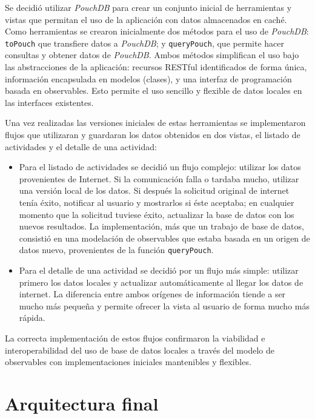Se decidió utilizar \textit{PouchDB} para crear un conjunto inicial de herramientas y vistas que permitan el uso de la aplicación con datos almacenados en caché. Como herramientas se crearon inicialmente dos métodos para el uso de \textit{PouchDB}: \texttt{toPouch} que transfiere datos a \textit{PouchDB}; y \texttt{queryPouch}, que permite hacer consultas y obtener datos de \textit{PouchDB}. Ambos métodos simplifican el uso bajo las abstracciones de la aplicación: recursos RESTful identificados de forma única, información encapsulada en modelos (clases), y una interfaz de programación basada en observables. Esto permite el uso sencillo y flexible de datos locales en las interfaces existentes.

Una vez realizadas las versiones iniciales de estas herramientas se implementaron flujos que utilizaran y guardaran los datos obtenidos en dos vistas, el listado de actividades y el detalle de una actividad:
\begin{itemize}
  \item Para el listado de actividades se decidió un flujo complejo: utilizar los datos provenientes de Internet. Si la comunicación falla o tardaba mucho, utilizar una versión local de los datos. Si después la solicitud original de internet tenía éxito, notificar al usuario y mostrarlos si éste aceptaba; en cualquier momento que la solicitud tuviese éxito, actualizar la base de datos con los nuevos resultados. La implementación, más que un trabajo de base de datos, consistió en una modelación de observables que estaba basada en un origen de datos nuevo, provenientes de la función \texttt{queryPouch}.

  \item Para el detalle de una actividad se decidió por un flujo más simple: utilizar primero los datos locales y actualizar automáticamente al llegar los datos de internet. La diferencia entre ambos orígenes de información tiende a ser mucho más pequeña y permite ofrecer la vista al usuario de forma mucho más rápida.
\end{itemize}

La correcta implementación de estos flujos confirmaron la viabilidad e interoperabilidad del uso de base de datos locales a través del modelo de observables con implementaciones iniciales mantenibles y flexibles.

\section{Arquitectura final}

